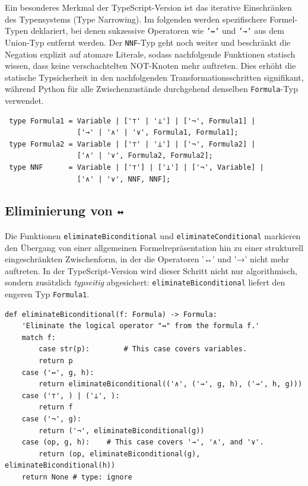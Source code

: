 Ein besonderes Merkmal der TypeScript-Version ist das iterative Einschränken des Typensystems (Type Narrowing). Im folgenden werden spezifischere Formel-Typen deklariert, bei denen sukzessive Operatoren wie \texttt{'↔'} und \texttt{'→'} aus dem Union-Typ entfernt werden. Der \texttt{NNF}-Typ geht noch weiter und beschränkt die Negation explizit auf atomare Literale, sodass nachfolgende Funktionen statisch wissen, dass keine verschachtelten NOT-Knoten mehr auftreten. Dies erhöht die statische Typsicherheit in den nachfolgenden Transformationsschritten signifikant, während Python für alle Zwischenzustände durchgehend denselben \texttt{Formula}-Typ verwendet.


\begin{verbatim}
 type Formula1 = Variable | ['⊤' | '⊥'] | ['¬', Formula1] | 
                 ['→' | '∧' | '∨', Formula1, Formula1];
 type Formula2 = Variable | ['⊤' | '⊥'] | ['¬', Formula2] | 
                 ['∧' | '∨', Formula2, Formula2];
 type NNF      = Variable | ['⊤'] | ['⊥'] | ['¬', Variable] | 
                 ['∧' | '∨', NNF, NNF];
\end{verbatim}


\subsection{Eliminierung von \texttt{↔}}
Die Funktionen \texttt{eliminateBiconditional} und \texttt{eliminateConditional} markieren den Übergang von einer allgemeinen Formelrepräsentation hin zu einer strukturell eingeschränkten Zwischenform, in der die Operatoren '↔' und '→' nicht mehr auftreten. 
In der TypeScript-Version wird dieser Schritt nicht nur algorithmisch, sondern zusätzlich \textit{typseitig} abgesichert: \texttt{eliminateBiconditional} liefert den engeren Typ \texttt{Formula1}. 

\begin{verbatim}
def eliminateBiconditional(f: Formula) -> Formula:
    'Eliminate the logical operator "↔" from the formula f.'
    match f:
        case str(p):        # This case covers variables.
        return p
    case ('↔', g, h):
        return eliminateBiconditional(('∧', ('→', g, h), ('→', h, g)))
    case ('⊤', ) | ('⊥', ):
        return f
    case ('¬', g):
        return ('¬', eliminateBiconditional(g))
    case (op, g, h):    # This case covers '→', '∧', and '∨'.
        return (op, eliminateBiconditional(g), eliminateBiconditional(h))
    return None # type: ignore
\end{verbatim}

